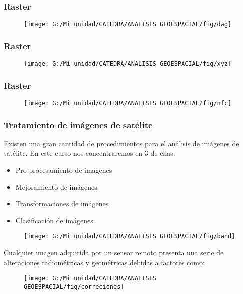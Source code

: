 \documentclass[14pt]{beamer}
\begin{document}
\begin{frame}
\frametitle{Raster}
  \begin{figure}
    \centering
    \texttt{[image: G:/Mi unidad/CATEDRA/ANALISIS GEOESPACIAL/fig/dwg]}
  \end{figure}
\end{frame}
\begin{frame}
\frametitle{Raster}
  \begin{figure}
    \centering
    \texttt{[image: G:/Mi unidad/CATEDRA/ANALISIS GEOESPACIAL/fig/xyz]}
  \end{figure}
\end{frame}
\begin{frame}
\frametitle{Raster}
  \begin{figure}
    \centering
    \texttt{[image: G:/Mi unidad/CATEDRA/ANALISIS GEOESPACIAL/fig/nfc]}
  \end{figure}
\end{frame}
\begin{frame}
\frametitle{Tratamiento de imágenes de satélite}
\scriptsize{Existen una gran cantidad de procedimientos para el análisis de imágenes de satélite. En este curso nos concentraremos en 3 de ellas:}
\begin{itemize}
\item Pro-procesamiento de imágenes
\item Mejoramiento de imágenes
\item Transformaciones de imágenes
\item Clasificación de imágenes.
\end{itemize}
  \begin{figure}
    \centering
    \texttt{[image: G:/Mi unidad/CATEDRA/ANALISIS GEOESPACIAL/fig/band]}
  \end{figure}
\end{frame}
\begin{frame}
\scriptsize{Cualquier imagen adquirida por un sensor remoto presenta una serie de alteraciones radiométricas y geométricas debidas a factores como:}
  \begin{figure}
    \centering
    \texttt{[image: G:/Mi unidad/CATEDRA/ANALISIS GEOESPACIAL/fig/correciones]}
  \end{figure}
\end{frame}
\end{document}
